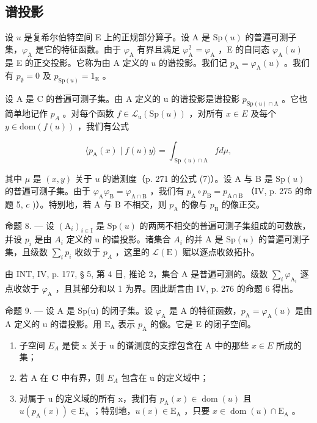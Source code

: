 \subsection{谱投影}

设 \(u\) 是复希尔伯特空间 E 上的正规部分算子。设 A 是 \(\mathrm{Sp}(u)\) 的普遍可测子集，\(\varphi_{\mathrm{A}}\) 是它的特征函数。由于 \(\varphi_{\mathrm{A}}\) 有界且满足 \(\varphi_{\mathrm{A}}^{2} = \varphi_{\mathrm{A}}\) ，E 的自同态 \(\varphi_{\mathrm{A}}(u)\) 是 E 的正交投影。它称为由 A 定义的 \(u\) 的谱投影。我们记 \(p_{\mathrm{A}} = \varphi_{\mathrm{A}}(u)\) 。我们有 \(p_{\emptyset} = 0\) 及 \(p_{\mathrm{Sp}(u)} = 1_{\mathrm{E}}\) 。

设 A 是 C 的普遍可测子集。由 A 定义的 u 的谱投影是谱投影 \(p_{\mathrm{Sp}(u)\cap\mathrm{A}}\) 。它也简单地记作 \(p_{A}\) 。对每个函数 \(f \in \mathcal{L}_{\mathrm{u}}(\mathrm{Sp}(u))\) ，对所有 \(x \in E\) 及每个 \(y \in \mathrm{dom}(f(u))\) ，我们有公式

\[
\langle p _ {\mathrm{A}} (x) \mid f (u) y \rangle = \int_ {\operatorname{Sp} (u) \cap \mathrm{A}} f d \mu ,\tag{10}
\]

其中 \(\mu\) 是 \((x,y)\) 关于 \(u\) 的谱测度（p. 271 的公式 (7)）。设 A 与 B 是 \(\mathrm{Sp}(u)\) 的普遍可测子集。由于 \(\varphi_{\mathrm{A}}\varphi_{\mathrm{B}} = \varphi_{\mathrm{A}\cap \mathrm{B}}\) ，我们有 \(p_{\mathrm{A}} \circ p_{\mathrm{B}} = p_{\mathrm{A}\cap \mathrm{B}}\) （IV, p. 275 的命题 5, \(c\) )）。特别地，若 A 与 B 不相交，则 \(p_{\mathrm{A}}\) 的像与 \(p_{\mathrm{B}}\) 的像正交。

命题 8. --- 设 \((\mathrm{A}_{i})_{i\in\mathrm{I}}\) 是 \(\mathrm{Sp}(u)\) 的两两不相交的普遍可测子集组成的可数族，并设 \(p_{i}\) 是由 \(A_{i}\) 定义的 u 的谱投影。诸集合 \(A_{i}\) 的并 A 是 \(\mathrm{Sp}(u)\) 的普遍可测子集，且级数 \(\sum_{i}p_{i}\) 收敛于 \(p_{A}\) ，这里的 \(\mathcal{L}(\mathrm{E})\) 赋以逐点收敛拓扑。

由 INT, IV, p. 177, § 5, 第 4 目, 推论 2，集合 A 是普遍可测的。级数 \(\sum_{i} \varphi_{\mathrm{A}_{i}}\) 逐点收敛于 \(\varphi_{\mathrm{A}}\) ，且其部分和以 1 为界。因此断言由 IV, p. 276 的命题 6 得出。

命题 9. --- 设 A 是 Sp(u) 的闭子集。设 \(\varphi_{\mathrm{A}}\) 是 A 的特征函数，\(p_{\mathrm{A}} = \varphi_{\mathrm{A}}(u)\) 是由 A 定义的 u 的谱投影。用 \(\mathrm{E}_{\mathrm{A}}\) 表示 \(p_{\mathrm{A}}\) 的像。它是 E 的闭子空间。

\begin{enumerate}
\def\labelenumi{\alph{enumi})}
\item
  子空间 \(E_{A}\) 是使 x 关于 u 的谱测度的支撑包含在 A 中的那些 \(x \in E\) 所成的集；
\item
  若 A 在 \(\mathbf C\) 中有界，则 \(E_{A}\) 包含在 u 的定义域中；
\item
  对属于 u 的定义域的所有 x，我们有 \(p_{\mathrm{A}}(x) \in \operatorname{dom}(u)\) 且 \(u(p_{\mathrm{A}}(x)) \in \mathrm{E}_{\mathrm{A}}\) ；特别地，\(u(x) \in \mathrm{E}_{\mathrm{A}}\) ，只要 \(x \in \operatorname{dom}(u) \cap \mathrm{E}_{\mathrm{A}}\) 。
\end{enumerate}

